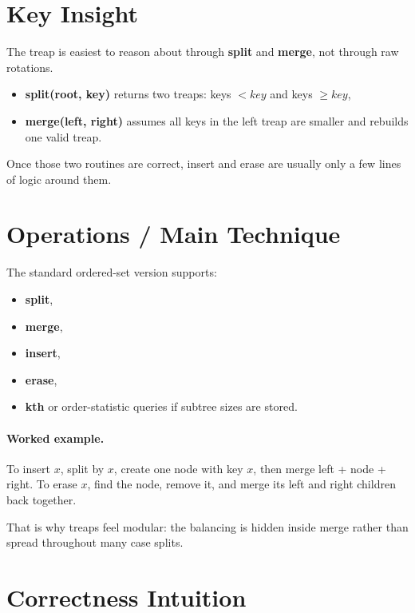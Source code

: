 \section*{Key Insight}

The treap is easiest to reason about through \textbf{split} and \textbf{merge}, not through raw rotations.

\begin{itemize}
  \item \textbf{split(root, key)} returns two treaps: keys \(< key\) and keys \(\ge key\),
  \item \textbf{merge(left, right)} assumes all keys in the left treap are smaller and rebuilds one valid treap.
\end{itemize}

Once those two routines are correct, insert and erase are usually only a few lines of logic around them.

\section*{Operations / Main Technique}

The standard ordered-set version supports:

\begin{itemize}
  \item \textbf{split},
  \item \textbf{merge},
  \item \textbf{insert},
  \item \textbf{erase},
  \item \textbf{kth} or order-statistic queries if subtree sizes are stored.
\end{itemize}

\paragraph{Worked example.}
To insert \(x\), split by \(x\), create one node with key \(x\), then merge left + node + right. To erase \(x\), find
the node, remove it, and merge its left and right children back together.

That is why treaps feel modular: the balancing is hidden inside merge rather than spread throughout many case splits.

\section*{Correctness Intuition}

